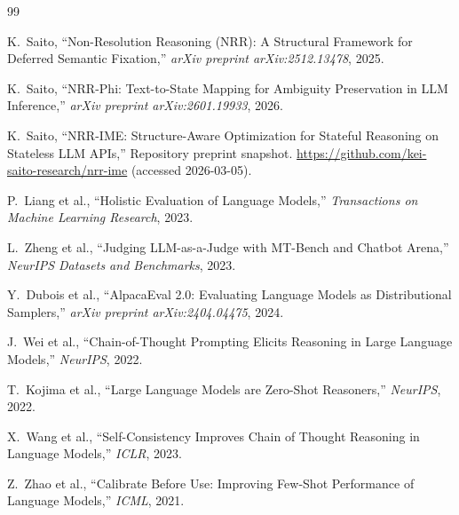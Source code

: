 \documentclass[11pt,a4paper]{article}
\begin{document}
\begin{thebibliography}{99}

K.~Saito,
\newblock ``Non-Resolution Reasoning (NRR): A Structural Framework for Deferred Semantic Fixation,''
\newblock \emph{arXiv preprint arXiv:2512.13478}, 2025.

K.~Saito,
\newblock ``NRR-Phi: Text-to-State Mapping for Ambiguity Preservation in LLM Inference,''
\newblock \emph{arXiv preprint arXiv:2601.19933}, 2026.

K.~Saito,
\newblock ``NRR-IME: Structure-Aware Optimization for Stateful Reasoning on Stateless LLM APIs,''
\newblock Repository preprint snapshot. \url{https://github.com/kei-saito-research/nrr-ime} (accessed 2026-03-05).

P.~Liang et al.,
\newblock ``Holistic Evaluation of Language Models,''
\newblock \emph{Transactions on Machine Learning Research}, 2023.

L.~Zheng et al.,
\newblock ``Judging LLM-as-a-Judge with MT-Bench and Chatbot Arena,''
\newblock \emph{NeurIPS Datasets and Benchmarks}, 2023.

Y.~Dubois et al.,
\newblock ``AlpacaEval 2.0: Evaluating Language Models as Distributional Samplers,''
\newblock \emph{arXiv preprint arXiv:2404.04475}, 2024.

J.~Wei et al.,
\newblock ``Chain-of-Thought Prompting Elicits Reasoning in Large Language Models,''
\newblock \emph{NeurIPS}, 2022.

T.~Kojima et al.,
\newblock ``Large Language Models are Zero-Shot Reasoners,''
\newblock \emph{NeurIPS}, 2022.

X.~Wang et al.,
\newblock ``Self-Consistency Improves Chain of Thought Reasoning in Language Models,''
\newblock \emph{ICLR}, 2023.

Z.~Zhao et al.,
\newblock ``Calibrate Before Use: Improving Few-Shot Performance of Language Models,''
\newblock \emph{ICML}, 2021.

\end{thebibliography}
\end{document}

